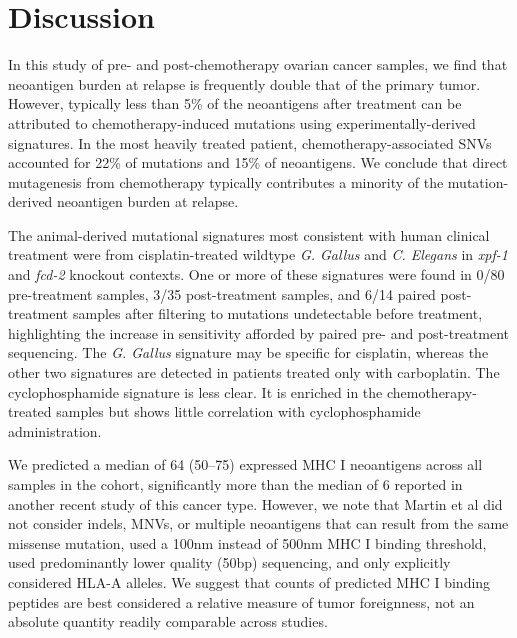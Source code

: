 \section*{Discussion}

In this study of pre- and post-chemotherapy ovarian cancer samples, we find that neoantigen burden at relapse is frequently double that of the primary tumor. However, typically less than 5\% of the neoantigens after treatment can be attributed to chemotherapy-induced mutations using experimentally-derived signatures. In the most heavily treated patient, chemotherapy-associated SNVs accounted for 22\% of mutations and 15\% of neoantigens. We conclude that direct mutagenesis from chemotherapy typically contributes a minority of the mutation-derived neoantigen burden at relapse.

The animal-derived mutational signatures most consistent with human clinical treatment were from cisplatin-treated wildtype \textit{G. Gallus} and \textit{C. Elegans} in \textit{xpf-1} and \textit{fcd-2} knockout contexts. One or more of these signatures were found in 0/80 pre-treatment samples, 3/35 post-treatment samples, and 6/14 paired post-treatment samples after filtering to mutations undetectable before treatment, highlighting the increase in sensitivity afforded by paired pre- and post-treatment sequencing. The \textit{G. Gallus} signature may be specific for cisplatin, whereas the other two signatures are detected in patients treated only with carboplatin. The cyclophosphamide signature is less clear. It is enriched in the chemotherapy-treated samples but shows little correlation with cyclophosphamide administration.



We predicted a median of 64 (50--75) expressed MHC I neoantigens across all samples in the cohort, significantly more than the median of 6 reported in another recent study of this cancer type\cite{Martin_2016}. However, we note that Martin et al did not consider indels, MNVs, or multiple neoantigens that can result from the same missense mutation, used a 100nm instead of 500nm MHC I binding threshold, used predominantly lower quality (50bp) sequencing, and only explicitly considered HLA-A alleles. We suggest that counts of predicted MHC I binding peptides are best considered a relative measure of tumor foreignness, not an absolute quantity readily comparable across studies.

